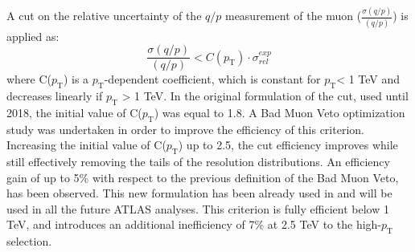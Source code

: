 A cut on the relative uncertainty of the $q/p$ measurement of the muon ($\frac{\sigma(q/p)}{(q/p)}$) is applied as:
\begin{equation}\label{cut}
\frac{\sigma(q/p)}{(q/p)} < C(p_\mathrm{T})\cdot \sigma_{rel}^{exp}
\end{equation}
where C($p_\mathrm{T}$) is a $p_\mathrm{T}$-dependent coefficient, which is constant for $p_\mathrm{T}$< 1 TeV and decreases linearly if $p_\mathrm{T}$ > 1 TeV. In the original formulation of the cut, used until 2018, the initial value of C($p_\mathrm{T}$) was equal to 1.8. A Bad Muon Veto optimization study was undertaken in order to improve the efficiency of this criterion. Increasing the initial value of C($p_\mathrm{T}$) up to 2.5, the cut efficiency improves while still effectively removing the tails of the resolution distributions. An efficiency gain of up to 5\% with respect to the previous definition of the Bad Muon Veto, has been observed. This new formulation has been already used in \cite{ATLAS-CONF-2019-001} and will be used in all the future ATLAS analyses. This criterion is fully efficient below 1 TeV, and introduces an additional inefficiency of 7\% at 2.5 TeV to the high-$p_\mathrm{T}$ selection.
